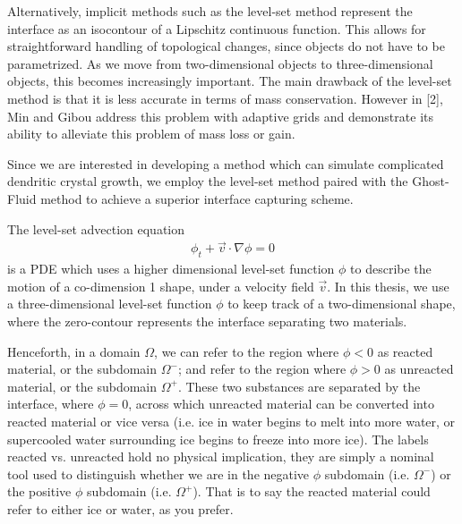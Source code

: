 \documentclass[oneside,12pt,final]{/Applications/TeX/packages/ucthesis-CA2012}
\begin{document}
\begin{mainmatter}
Alternatively, implicit methods such as the level-set method represent the interface as an isocontour of a Lipschitz continuous function. This allows for straightforward handling of topological changes, since objects do not have to be parametrized. As we move from two-dimensional objects to three-dimensional objects, this becomes increasingly important. The main drawback of the level-set method is that it is less accurate in terms of mass conservation. However in [2], Min and Gibou address this problem with adaptive grids and demonstrate its ability to alleviate this problem of mass loss or gain.

Since we are interested in developing a method which can simulate complicated dendritic crystal growth, we employ the level-set method paired with the Ghost-Fluid method to achieve a superior interface capturing scheme.

The level-set advection equation
\begin{equation} \label{eqn:level_set}
\begin{aligned}
\phi_t + \vec{v} \cdot \nabla \phi = 0
\end{aligned}
\end{equation}
is a PDE which uses a higher dimensional level-set function $\phi$ to describe the motion of a co-dimension 1 shape, under a velocity field $\vec{v}$. In this thesis, we use a three-dimensional level-set function $\phi$ to keep track of a two-dimensional shape, where the zero-contour represents the interface separating two materials.

Henceforth, in a domain $\Omega$, we can refer to the region where $\phi < 0$ as reacted material, or the subdomain $\Omega^-$; and refer to the region where $\phi > 0$ as unreacted material, or the subdomain $\Omega^+$. These two substances are separated by the interface, where $\phi = 0$, across which unreacted material can be converted into reacted material or vice versa (i.e. ice in water begins to melt into more water, or supercooled water surrounding ice begins to freeze into more ice). The labels reacted vs. unreacted hold no physical implication, they are simply a nominal tool used to distinguish whether we are in the negative $\phi$ subdomain (i.e. $\Omega^-$) or the positive $\phi$ subdomain (i.e. $\Omega^+$). That is to say the reacted material could refer to either ice or water, as you prefer.


\end{mainmatter}
\end{document}

